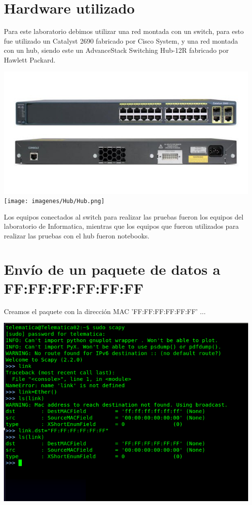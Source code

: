 ﻿\documentclass[spanish]{udpreport}
\begin{document}

\section{Hardware utilizado}

Para este laboratorio debimos utilizar una red montada con un switch, para esto fue utilizado un Catalyst 2690 fabricado por Cisco System, y una red montada con un hub, siendo este un AdvanceStack Switching Hub-12R fabricado por Hawlett Packard.

\begin{center}
	\includegraphics[scale=.5]{imagenes/Switch/switch.png}
	\texttt{[image: imagenes/Hub/Hub.png]}
	\linebreak
\end{center}

Los equipos conectados al switch para realizar las pruebas fueron los equipos del laboratorio de Informatica, mientras que los equipos que fueron utilizados para realizar las pruebas con el hub fueron notebooks.

\newpage


\section{Envío de un paquete de datos a FF:FF:FF:FF:FF:FF}

Creamos el paquete con la dirección MAC 'FF:FF:FF:FF:FF:FF' ...

\begin{center}
	\includegraphics[scale=.37]{imagenes/Switch/Test_1a_b.png}
\end{center}
\end{document}

